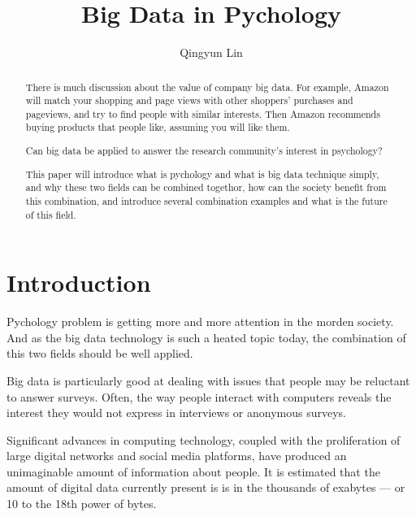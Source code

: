 

\title{Big Data in Pychology}


\author{Qingyun Lin}


\renewcommand{\shortauthors}{G. v. Laszewski}


\begin{abstract}
There is much discussion about the value of company big data. For example, Amazon will match your shopping and page views with other shoppers’ purchases and pageviews, and try to find people with similar interests. Then Amazon recommends buying products that people like, assuming you will like them.

Can big data be applied to answer the research community’s interest in psychology?

This paper will introduce what is pychology and what is big data technique simply, and why these two fields can be combined togethor, how can the society benefit from this combination, and introduce several combination examples and what is the future of this field.
\end{abstract}



\maketitle

\section{Introduction}

Pychology problem is getting more and more attention in the morden 
society. And as the big data technology is such a heated topic today, 
the combination of this two fields should be well applied.

Big data is particularly good at dealing with issues that people may 
be reluctant to answer surveys. Often, the way people interact with 
computers reveals the interest they would not express in interviews 
or anonymous surveys\cite{editor00}.

Significant advances in computing technology, coupled with the proliferation of large digital networks and social media platforms, have produced an unimaginable amount of information about people. It is estimated that the amount of digital data currently present is is in the thousands of exabytes — or 10 to the 18th power of bytes.

